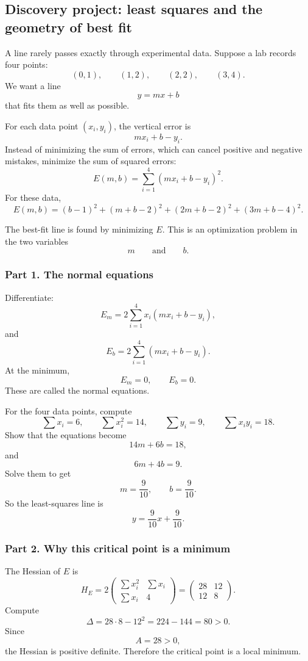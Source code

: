 \subsection{Discovery project: least squares and the geometry of best fit}

A line rarely passes exactly through experimental data.  Suppose a lab records four
points:
\[
    (0,1),\qquad (1,2),\qquad (2,2),\qquad (3,4).
\]
We want a line
\[
    y=mx+b
\]
that fits them as well as possible.

For each data point \((x_i,y_i)\), the vertical error is
\[
    mx_i+b-y_i.
\]
Instead of minimizing the sum of errors, which can cancel positive and negative
mistakes, minimize the sum of squared errors:
\[
\boxed{
    E(m,b)=\sum_{i=1}^4(mx_i+b-y_i)^2.
}
\]
For these data,
\[
\boxed{
    E(m,b)
    =
    (b-1)^2+(m+b-2)^2+(2m+b-2)^2+(3m+b-4)^2.
}
\]

The best-fit line is found by minimizing \(E\).  This is an optimization problem in the
two variables
\[
    m
    \qquad\text{and}\qquad
    b.
\]

\subsubsection*{Part 1. The normal equations}

Differentiate:
\[
    E_m=2\sum_{i=1}^4 x_i(mx_i+b-y_i),
\]
and
\[
    E_b=2\sum_{i=1}^4 (mx_i+b-y_i).
\]
At the minimum,
\[
    E_m=0,
    \qquad
    E_b=0.
\]
These are called the normal equations.

For the four data points, compute
\[
    \sum x_i=6,
    \qquad
    \sum x_i^2=14,
    \qquad
    \sum y_i=9,
    \qquad
    \sum x_iy_i=18.
\]
Show that the equations become
\[
\boxed{
    14m+6b=18,
}
\]
and
\[
\boxed{
    6m+4b=9.
}
\]
Solve them to get
\[
\boxed{
    m=\frac{9}{10},
    \qquad
    b=\frac{9}{10}.
}
\]
So the least-squares line is
\[
\boxed{
    y=\frac{9}{10}x+\frac{9}{10}.
}
\]

\subsubsection*{Part 2. Why this critical point is a minimum}

The Hessian of \(E\) is
\[
    H_E
    =
    2
    \begin{pmatrix}
        \sum x_i^2 & \sum x_i\\
        \sum x_i & 4
    \end{pmatrix}
    =
    \begin{pmatrix}
        28 & 12\\
        12 & 8
    \end{pmatrix}.
\]
Compute
\[
    \Delta=28\cdot8-12^2=224-144=80>0.
\]
Since
\[
    A=28>0,
\]
the Hessian is positive definite.  Therefore the critical point is a local minimum.

